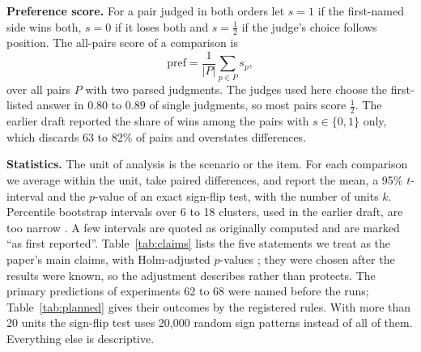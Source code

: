 \documentclass[10pt,twocolumn]{article}
\begin{document}
\textbf{Preference score.} For a pair judged in both orders let $s=1$
if the first-named side wins both, $s=0$ if it loses both and
$s=\tfrac12$ if the judge's choice follows position. The all-pairs
score of a comparison is
\begin{equation}
\mathrm{pref} = \frac{1}{|P|}\sum_{p\in P} s_p ,
\label{eq:pref}
\end{equation}
over all pairs $P$ with two parsed judgments. The judges used here
choose the first-listed answer in $0.80$ to $0.89$ of single
judgments, so most pairs score $\tfrac12$. The earlier draft reported
the share of wins among the pairs with $s\in\{0,1\}$ only, which
discards 63 to 82\% of pairs and overstates differences.

\textbf{Statistics.} The unit of analysis is the scenario or the item.
For each comparison we average within the unit, take paired
differences, and report the mean, a 95\% $t$-interval and the $p$-value
of an exact sign-flip test, with the number of units $k$. Percentile
bootstrap intervals over 6 to 18 clusters, used in the earlier draft,
are too narrow \cite{cameron2008bootstrap,miller2024errorbars}. A few
intervals are quoted as originally computed and are marked ``as first
reported''. Table~\ref{tab:claims} lists the five statements we treat
as the paper's main claims, with Holm-adjusted $p$-values
\cite{holm1979}; they were chosen after the results were known, so the
adjustment describes rather than protects. The primary predictions of
experiments 62 to 68 were named before the runs;
Table~\ref{tab:planned} gives their outcomes by the registered rules.
With more than 20 units the sign-flip test uses 20{,}000 random sign
patterns instead of all of them.
Everything else is descriptive.
\end{document}
